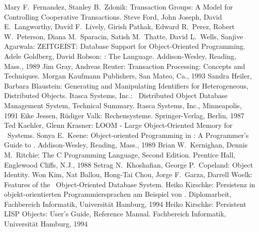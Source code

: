 \begin{thebibliography}{Stonebraker \etal\ 86a}
Mary F.\ Fernandez, Stanley B.\ Zdonik:
Transaction Groups:
A Model for Controlling Cooperative Transactions.
%
Steve Ford, John Joseph, David E.\ Langworthy, David F.\ Lively,
Girish Pathak, Edward R.\ Perez, Robert W.\ Peterson, Diana
M.\ Sparacin, Satish M.\ Thatte, David L.\ Wells, Sanjive Agarwala:
ZEITGEIST: Database Support for Object-Oriented Programming.
%
Adele Goldberg, David Robson:
\smalltalk: The Language.
Addison-Wesley, Reading, Mass., 1989
%
Jim Gray, Andreas Reuter:
Transaction Processing:
Concepts and Techniques.
Morgan Kaufmann Publishers, San Mateo, Ca., 1993
%
Sandra Heiler, Barbara Blaustein:
Generating and Manipulating Identifiers
for Heterogeneous, Distributed Objects.
%
Itasca Systems, Inc.:
\itasca\ Distributed Object Database Management System,
Technical Summary.
Itasca Systems, Inc., Minneapolis, 1991
%
Eike Jessen, R\"{u}diger Valk:
Rechensysteme.
Springer-Verlag, Berlin, 1987
%
Ted Kaehler, Glenn Krasner:
LOOM - Large Object-Oriented Memory for \smalltalk\ Systems.
%
Sonya E.\ Keene:
Object-oriented Programming in \cl:
A Programmer's Guide to \clos.
Addison-Wesley, Reading, Mass., 1989
%
Brian W.\ Kernighan, Dennis M.\ Ritchie:
The C Programming Language,
Second Edition.
Prentice Hall, Englewood Cliffs, N.J., 1988
%
Setrag N.\ Khoshafian, George P.\ Copeland:
Object Identity.
%
Won Kim, Nat Ballou, Hong-Tai Chou, Jorge F.\ Garza, Darrell Woelk:
Features of the \orion\ Object-Oriented Database System.
%
\ifbericht
{}
Heiko Kirschke:
Persistenz in objekt-orientierten Programmiersprachen am Beispiel von
\clos.
Diplomarbeit,
Fachbereich Informatik, Universit\"{a}t Hamburg,
1994
\fi
%
\ifbericht
{}
\else
{}
\fi
Heiko Kirschke:
Persistent LISP Objects:
User's Guide, Reference Manual.
Fachbereich Informatik, Universit\"{a}t Hamburg,
1994
%

\end{thebibliography}
